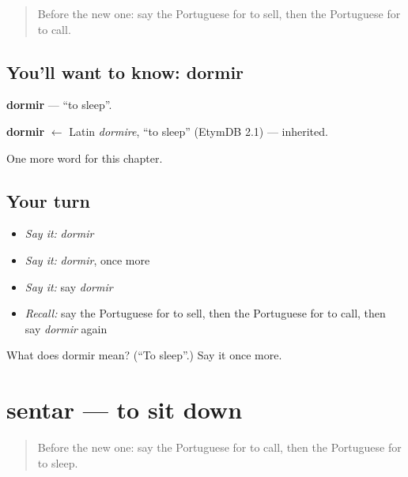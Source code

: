 \label{lesson:PT-C41-dormir}



\begin{quote}
Before the new one: say the Portuguese for to sell, then the Portuguese for to call.
\end{quote}

\subsection*{You'll want to know: dormir}
\textbf{dormir} — \textquotedblleft{}to sleep\textquotedblright{}.

\begin{cousinweb}
\textbf{dormir} $\leftarrow$ Latin \emph{dormire}, \textquotedblleft{}to sleep\textquotedblright{} (EtymDB 2.1) — inherited.
\end{cousinweb}

\begin{grammarlens}[title={What you've built}]
One more word for this chapter.
\end{grammarlens}

\subsection*{Your turn}
\begin{itemize}
\raggedright
  \item \emph{Say it:} \emph{dormir}
  \item \emph{Say it:} \emph{dormir}, once more
  \item \emph{Say it:} say \emph{dormir}
  \item \emph{Recall:} say the Portuguese for to sell, then the Portuguese for to call, then say \emph{dormir} again
\end{itemize}

\begin{tcolorbox}[breakable,colback=teal!4,colframe=teal!35!black,title={Before you move on}]
What does dormir mean? (\textquotedblleft{}To sleep\textquotedblright{}.) Say it once more.
\end{tcolorbox}
\section[sentar]{sentar — to sit down}

\label{lesson:PT-C41-sentar}



\begin{quote}
Before the new one: say the Portuguese for to call, then the Portuguese for to sleep.
\end{quote}

